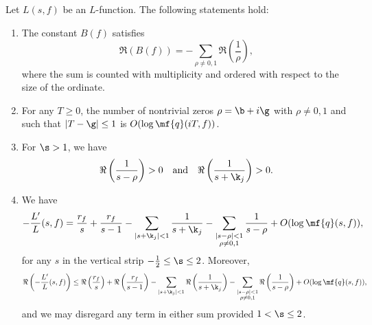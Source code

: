     \begin{lemma}\label{lem:powerful_L-function_approximation_lemma}
      Let $L(s,f)$ be an $L$-function. The following statements hold:
      \begin{enumerate}[label=(\roman*)]
        \item The constant $B(f)$ satisfies
        \[
          \Re(B(f)) = -\sum_{\rho \neq 0,1}\Re\left(\frac{1}{\rho}\right),
        \]
        where the sum is counted with multiplicity and ordered with respect to the size of the ordinate.
        \item For any $T \ge 0$, the number of nontrivial zeros $\rho = \b+i\g$ with $\rho \neq 0,1$ and such that $|T-\g| \le 1$ is $O(\log{\mf{q}(iT,f)})$.
        \item For $\s > 1$, we have
        \[
          \Re\left(\frac{1}{s-\rho}\right) > 0 \quad \text{and} \quad \Re\left(\frac{1}{s+\k_{j}}\right) > 0.
        \]
        \item We have
        \[
          -\frac{L'}{L}(s,f) = \frac{r_{f}}{s}+\frac{r_{f}}{s-1}-\sum_{|s+\k_{j}| < 1}\frac{1}{s+\k_{j}}-\sum_{\substack{|s-\rho| < 1 \\ \rho \neq 0,1}}\frac{1}{s-\rho}+O(\log{\mf{q}(s,f)}),
        \]
        for any $s$ in the vertical strip $-\frac{1}{2} \le \s \le 2$. Moreover,
        \[
          \Re\left(-\frac{L'}{L}(s,f)\right) \le \Re\left(\frac{r_{f}}{s}\right)+\Re\left(\frac{r_{f}}{s-1}\right)-\sum_{|s+\k_{j}| < 1}\Re\left(\frac{1}{s+\k_{j}}\right)-\sum_{\substack{|s-\rho| < 1 \\ \rho \neq 0,1}}\Re\left(\frac{1}{s-\rho}\right)+O(\log{\mf{q}(s,f)}),
        \]
        and we may disregard any term in either sum provided $1 < \s \le 2$.
      \end{enumerate}
    \end{lemma}
